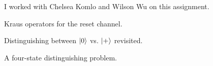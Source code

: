 \documentclass[boxes,pages]{homework}
\begin{document}
\noindent
I worked with Chelsea Komlo and Wilson Wu on this assignment.

\begin{problem}
Kraus operators for the reset channel.
\end{problem}

\begin{solution}
\end{solution}

\begin{problem}
Distinguishing between $\ket{0}$ vs. $\ket{+}$ revisited.
\end{problem}

\begin{solution}

\end{solution}

\begin{problem}
A four-state distinguishing problem.
\end{problem}

\begin{solution}

\end{solution}
\end{document}
